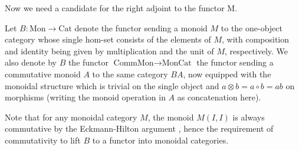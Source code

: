 \documentclass{amsbook} %
\newcommand{\mon}{\ensuremath{\textrm{Mon}}}
\newcommand{\cmon}{\ensuremath{\textrm{CommMon}}}
\newcommand{\moncat}{\ensuremath{\textrm{MonCat}}}
\newcommand{\cat}{\ensuremath{\textrm{Cat}}}
\newenvironment{eq*}{\begin{equation*}}{\end{equation*}}
\numberwithin{section}{chapter}
\begin{document}
Now we need a candidate for the right adjoint to the functor $\mathrm{M}$.

\begin{Defi} 
Let $B: \mon \to \cat$ denote the functor sending a monoid $M$ to the one-object category whose single hom-set consists of the elements of $M$, with composition and identity being given by multiplication and the unit of $M$, respectively. We also denote by $B$ the functor $\cmon \to \moncat$ the functor sending a commutative monoid $A$ to the same category $BA$, now equipped with the monoidal structure which is trivial on the single object and $a \otimes b = a \circ b = ab$ on morphisms (writing the monoid operation in $A$ as concatenation here).
\end{Defi}

%
%


Note that for any monoidal category $M$, the monoid $M(I,I)$ is always commutative by the Eckmann-Hilton argument \cite{eh, cg-periodic2}, hence the requirement of commutativity to lift $B$ to a functor into monoidal categories.


\end{document}

